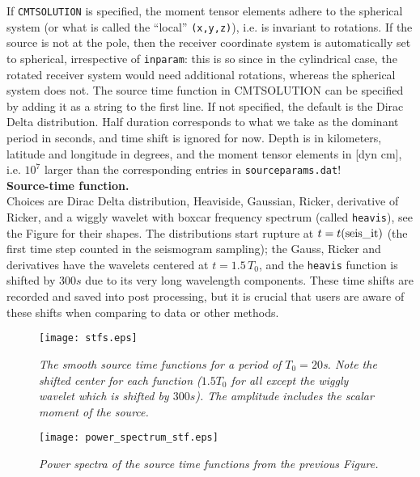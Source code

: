 \documentclass[11pt,letter,fleqn,english,notitlepage]{article}
\begin{document}
\noindent If {\tt CMTSOLUTION} is specified, the moment tensor elements adhere to the spherical system 
(or what is called the ``local'' {\tt (x,y,z)}), i.e. is invariant to rotations. 
If the source is not at the pole, then the receiver coordinate system is automatically set to spherical, irrespective of {\tt inparam}:
this is so since in the cylindrical case, the rotated receiver system would need additional rotations, 
whereas the spherical system does not. The source time function in CMTSOLUTION can be specified by adding it as a string 
to the first line. If not specified, the default is the Dirac Delta distribution. Half duration corresponds to what we take 
as the dominant period in seconds, and time shift is ignored for now.
Depth is in kilometers, latitude and longitude in degrees, and the
moment tensor elements in [dyn cm], i.e. $10^7$ larger than the corresponding entries in {\tt sourceparams.dat}! \\

\noindent \textbf{Source-time function.}\\
%
\noindent 
Choices are Dirac Delta distribution, Heaviside, Gaussian, Ricker, derivative of Ricker, and a wiggly wavelet with boxcar frequency 
spectrum (called {\tt heavis}), see the Figure for their shapes. 
The distributions start rupture at $t=t({\rm seis\_it})$ (the first time step counted in the seismogram 
sampling); the Gauss, Ricker and derivatives have the wavelets
centered at $t=1.5 \,T_0$, and the {\tt heavis} function is shifted by $300 s$ due to its very long wavelength components. These time 
shifts are recorded and saved into post processing, but it is crucial that users are aware of these shifts when comparing to 
data or other methods. \\
\begin{figure*}[htb]
\begin{center}
\texttt{[image: stfs.eps]}
\caption{\textit{The smooth source time functions for a period of $T_0=20$s. Note the shifted center for each function 
($1.5 T_0$ for all except the wiggly wavelet which is shifted by $300s$). The amplitude includes the scalar moment of the source. }}
\end{center}
\end{figure*}

\begin{figure*}[htb]
\begin{center}
\texttt{[image: power\_spectrum\_stf.eps]}
\caption{\textit{Power spectra of the source time functions from the previous Figure.}}
\end{center}
\end{figure*}
\end{document}
